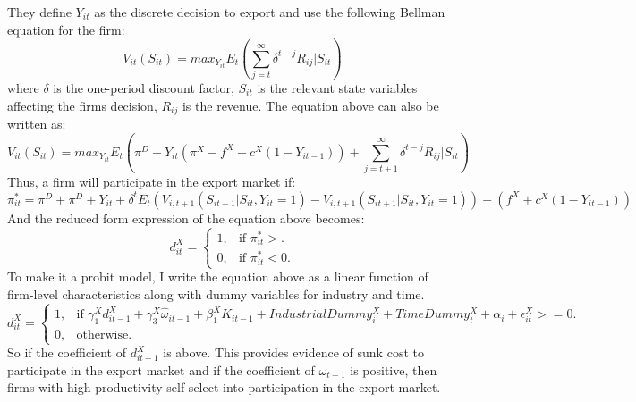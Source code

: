 \documentclass[11pt]{article}
\begin{document}
They define $Y_{it}$ as the discrete decision to export and use the
following Bellman equation for the firm:
\begin{equation}
V_{it}(S_{it})= max_{Y_{it}}E_{t}(\sum_{j=t}^{\infty} \delta^{t-j}R_{ij}|S_{it})
\end{equation}
 where $\delta$ is the one-period discount factor, $S_{it}$ is the
 relevant state variables affecting the firms decision, $R_{ij}$ is
 the revenue. The equation above can also be written as:
\begin{equation}
V_{it}(S_{it})= max_{Y_{it}}E_{t}(\pi^{D} + Y_{it}(\pi^{X}- f^{X} -
c^{X}(1-Y_{it-1}))  + \sum_{j=t+1}^{\infty} \delta^{t-j}R_{ij}|S_{it})
\end{equation}
 Thus, a firm will participate in the export market if:
\begin{equation}
\pi_{it}^{*} = \pi^{D}+\pi^{D}+ Y_{it}  +
\delta^{t}E_{t}(V_{i,t+1}(S_{it+1}|S_{it},Y_{it}=1) -
V_{i,t+1}(S_{it+1}|S_{it},Y_{it}=1) ) -  (f^{X} + c^{X}(1-Y_{it-1}))
\end{equation}
And the reduced form expression of the equation above becomes: 
\begin{equation}
  d_{it}^{X}=\begin{cases}
   1 , & \text{if $\pi_{it}^{*}>  $}.\\
   0 , & \text{if $\pi_{it}^{*}<  0$}.
  \end{cases}
\end{equation}
To make it a probit model, I write the equation above as a linear
function of firm-level characteristics along with dummy variables for
industry and time. 
\begin{equation}
  d_{it}^{X}=\begin{cases}
   1 , & \text{if $\gamma_{1}^{X} d_{it-1}^{X} + 
\gamma_{3}^{X} \hat{\omega}_{it-1}  + \beta_{1}^{X}K_{it-1}  +
IndustrialDummy_{i}^{X} + TimeDummy_{t}^{X}  + \alpha_{i}+ \epsilon_{it}^{X}>= 0   $}.\\
   0 , & \text{otherwise}.
  \end{cases}
\end{equation}
So if the coefficient of  $d_{it-1}^{X}$ is above. This provides
evidence of sunk cost to participate in the export market and if the
coefficient of $\omega_{t-1}$ is positive, then firms with high
productivity self-select into participation in the export market.
\end{document}
